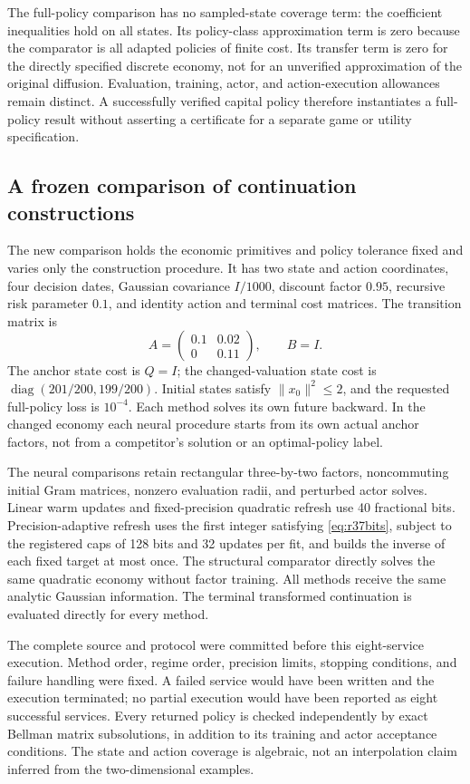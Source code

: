 \documentclass[ecta,nameyear,draft]{econsocart}
\theoremstyle{definition}
\theoremstyle{remark}
\begin{document}
The full-policy comparison has no sampled-state coverage term: the coefficient
inequalities hold on all states. Its policy-class approximation term is zero
because the comparator is all adapted policies of finite cost. Its transfer
term is zero for the directly specified discrete economy, not for an
unverified approximation of the original diffusion. Evaluation, training,
actor, and action-execution allowances remain distinct. A successfully
verified capital policy therefore instantiates a full-policy result without
asserting a certificate for a separate game or utility specification.

\subsection{A frozen comparison of continuation constructions}
The new comparison holds the economic primitives and policy tolerance fixed
and varies only the construction procedure. It has two state and action
coordinates, four decision dates, Gaussian covariance $I/1000$, discount
factor $0.95$, recursive risk parameter $0.1$, and identity action and terminal
cost matrices. The transition matrix is
\[
 A=\begin{pmatrix}0.1&0.02\\0&0.11\end{pmatrix},\qquad B=I.
\]
The anchor state cost is $Q=I$; the changed-valuation state cost is
$\operatorname{diag}(201/200,199/200)$. Initial states satisfy
$\|x_0\|^2\leq2$, and the requested full-policy loss is $10^{-4}$.
Each method solves its own future backward. In the changed economy each
neural procedure starts from its own actual anchor factors, not from a
competitor's solution or an optimal-policy label.

The neural comparisons retain rectangular three-by-two factors,
noncommuting initial Gram matrices, nonzero evaluation radii, and perturbed
actor solves. Linear warm updates and fixed-precision quadratic refresh use
40 fractional bits. Precision-adaptive refresh uses the first integer
satisfying \eqref{eq:r37bits}, subject to the registered caps of 128 bits and
32 updates per fit, and builds the inverse of each fixed target at most once.
The structural comparator directly solves the same quadratic economy without
factor training. All methods receive the same analytic Gaussian information.
The terminal transformed continuation is evaluated directly for every method.

The complete source and protocol were committed before this eight-service
execution. Method order, regime order, precision limits, stopping conditions,
and failure handling were fixed. A failed service would have been written
and the execution terminated; no partial execution would have been reported
as eight successful services. Every returned policy is checked independently
by exact Bellman matrix subsolutions, in addition to its training and actor
acceptance conditions. The state and action coverage is algebraic, not an
interpolation claim inferred from the two-dimensional examples.
\end{document}

